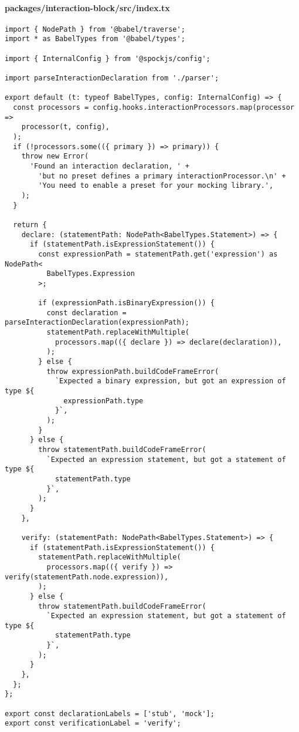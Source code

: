 \paragraph*{packages/interaction-block/src/index.tx}
\begin{verbatim}
import { NodePath } from '@babel/traverse';
import * as BabelTypes from '@babel/types';

import { InternalConfig } from '@spockjs/config';

import parseInteractionDeclaration from './parser';

export default (t: typeof BabelTypes, config: InternalConfig) => {
  const processors = config.hooks.interactionProcessors.map(processor =>
    processor(t, config),
  );
  if (!processors.some(({ primary }) => primary)) {
    throw new Error(
      'Found an interaction declaration, ' +
        'but no preset defines a primary interactionProcessor.\n' +
        'You need to enable a preset for your mocking library.',
    );
  }

  return {
    declare: (statementPath: NodePath<BabelTypes.Statement>) => {
      if (statementPath.isExpressionStatement()) {
        const expressionPath = statementPath.get('expression') as NodePath<
          BabelTypes.Expression
        >;

        if (expressionPath.isBinaryExpression()) {
          const declaration = parseInteractionDeclaration(expressionPath);
          statementPath.replaceWithMultiple(
            processors.map(({ declare }) => declare(declaration)),
          );
        } else {
          throw expressionPath.buildCodeFrameError(
            `Expected a binary expression, but got an expression of type ${
              expressionPath.type
            }`,
          );
        }
      } else {
        throw statementPath.buildCodeFrameError(
          `Expected an expression statement, but got a statement of type ${
            statementPath.type
          }`,
        );
      }
    },

    verify: (statementPath: NodePath<BabelTypes.Statement>) => {
      if (statementPath.isExpressionStatement()) {
        statementPath.replaceWithMultiple(
          processors.map(({ verify }) => verify(statementPath.node.expression)),
        );
      } else {
        throw statementPath.buildCodeFrameError(
          `Expected an expression statement, but got a statement of type ${
            statementPath.type
          }`,
        );
      }
    },
  };
};

export const declarationLabels = ['stub', 'mock'];
export const verificationLabel = 'verify';
\end{verbatim}

